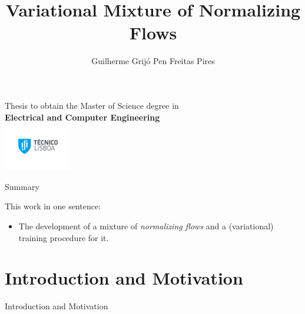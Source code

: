 \documentclass[12pt,ignorenonframetext,]{beamer}
\title{Variational Mixture of Normalizing Flows}
\author{Guilherme Grijó Pen Freitas Pires}
\begin{document}
{
\begin{frame}
  \titlepage
  \begin{center}
    \centering
    Thesis to obtain the Master of Science degree in \\
    \textbf{Electrical and Computer Engineering} \\
    \includegraphics[width=3cm]{IST_A_CMYK_POS.pdf}
  \end{center}
\end{frame}
}

\begin{frame}{Summary}
\protect\hypertarget{summary}{}

This work in one sentence:

\begin{itemize}
    \item The development of a mixture of \emph{normalizing flows}
    and a (variational) training procedure for it.
\end{itemize}

\end{frame}

\hypertarget{introduction-and-motivation}{%
\section{Introduction and
Motivation}\label{introduction-and-motivation}}

\begin{frame}{Introduction and Motivation}
\protect\hypertarget{introduction-and-motivation-1}{}

\begin{itemize}
    \begin{itemize}
    \end{itemize}
\end{itemize}

\end{frame}
\end{document}
